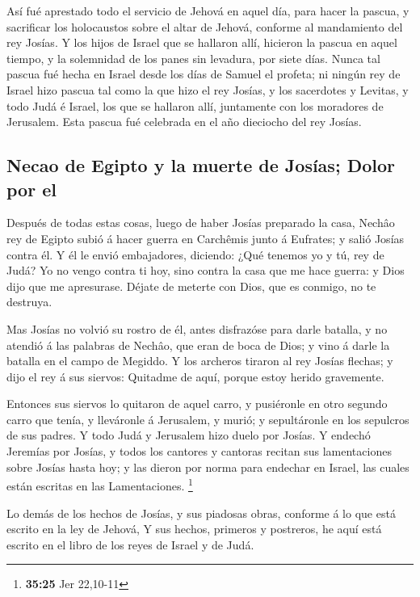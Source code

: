  Así fué aprestado todo el servicio de Jehová en aquel día,
para hacer la pascua, y sacrificar los holocaustos sobre el altar de
Jehová, conforme al mandamiento del rey Josías.  Y los
hijos de Israel que se hallaron allí, hicieron la pascua en aquel
tiempo, y la solemnidad de los panes sin levadura, por siete días.
 Nunca tal pascua fué hecha en Israel desde los días de
Samuel el profeta; ni ningún rey de Israel hizo pascua tal como la que
hizo el rey Josías, y los sacerdotes y Levitas, y todo Judá é Israel,
los que se hallaron allí, juntamente con los moradores de Jerusalem.
 Esta pascua fué celebrada en el año dieciocho del rey
Josías.

\hypertarget{necao-de-egipto-y-la-muerte-de-josuxedas-dolor-por-el}{%
\subsection{Necao de Egipto y la muerte de Josías; Dolor por
el}\label{necao-de-egipto-y-la-muerte-de-josuxedas-dolor-por-el}}

 Después de todas estas cosas, luego de haber Josías
preparado la casa, Nechâo rey de Egipto subió á hacer guerra en
Carchêmis junto á Eufrates; y salió Josías contra él.  Y él
le envió embajadores, diciendo: ¿Qué tenemos yo y tú, rey de Judá? Yo no
vengo contra ti hoy, sino contra la casa que me hace guerra: y Dios dijo
que me apresurase. Déjate de meterte con Dios, que es conmigo, no te
destruya.

 Mas Josías no volvió su rostro de él, antes disfrazóse
para darle batalla, y no atendió á las palabras de Nechâo, que eran de
boca de Dios; y vino á darle la batalla en el campo de Megiddo.
 Y los archeros tiraron al rey Josías flechas; y dijo el
rey á sus siervos: Quitadme de aquí, porque estoy herido gravemente.

 Entonces sus siervos lo quitaron de aquel carro, y
pusiéronle en otro segundo carro que tenía, y lleváronle á Jerusalem, y
murió; y sepultáronle en los sepulcros de sus padres. Y todo Judá y
Jerusalem hizo duelo por Josías.  Y endechó Jeremías por
Josías, y todos los cantores y cantoras recitan sus lamentaciones sobre
Josías hasta hoy; y las dieron por norma para endechar en Israel, las
cuales están escritas en las Lamentaciones. \footnote{\textbf{35:25} Jer
  22,10-11}

 Lo demás de los hechos de Josías, y sus piadosas obras,
conforme á lo que está escrito en la ley de Jehová,  Y sus
hechos, primeros y postreros, he aquí está escrito en el libro de los
reyes de Israel y de Judá.

